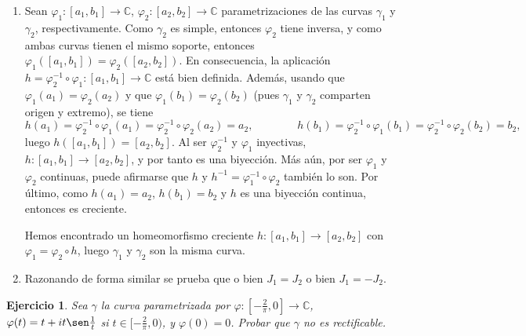 \documentclass[11pt]{report}
\makeatletter
\renewenvironment{proof}[1][\proofname]{\par
  \pushQED{\qed}%
  \normalfont \topsep\z@skip %
  \trivlist
  \item[\hskip\labelsep
        \itshape
    #1\@addpunct{.}]\ignorespaces
}{%
  \popQED\endtrivlist\@endpefalse
}
\newcommand{\C}{\mathbb C}
\newtheorem{exercise}{Ejercicio}
\makeatother
\begin{document}
\begin{proof}
\hfill
\begin{enumerate}
    \item Sean $\varphi_1 \colon [a_1,b_1] \to\C$, $\varphi_2 \colon [a_2,b_2] \to \C$ parametrizaciones de las curvas $\gamma_1$ y $\gamma_2$, respectivamente. Como $\gamma_2$ es simple, entonces $\varphi_2$ tiene inversa, y como ambas curvas tienen el mismo soporte, entonces $\varphi_1([a_1,b_1]) = \varphi_2([a_2,b_2])$. En consecuencia, la aplicación $h = \varphi_2^{-1} \circ \varphi_1 \colon [a_1,b_1] \to \C$ está bien definida. Además, usando que $\varphi_1(a_1)=\varphi_2(a_2)$ y que $\varphi_1(b_1) = \varphi_2(b_2)$ (pues $\gamma_1$ y $\gamma_2$ comparten origen y extremo), se tiene
    \[h(a_1) = \varphi_2^{-1} \circ \varphi_1(a_1) = \varphi_2^{-1} \circ \varphi_2(a_2) = a_2, \qquad \qquad h(b_1) = \varphi_2^{-1} \circ \varphi_1(b_1) = \varphi_2^{-1} \circ \varphi_2(b_2) = b_2,\]
    luego $h([a_1,b_1]) = [a_2,b_2]$. Al ser $\varphi_2^{-1}$ y $\varphi_1$ inyectivas, $h \colon [a_1,b_1] \to [a_2,b_2]$, y por tanto es una biyección. Más aún, por ser $\varphi_1$ y $\varphi_2$ continuas, puede afirmarse que $h$ y $h^{-1} = \varphi_1^{-1} \circ \varphi_2$ también lo son. Por último, como $h(a_1) = a_2$, $h(b_1) = b_2$ y $h$ es una biyección continua, entonces es creciente.

    Hemos encontrado un homeomorfismo creciente $h \colon [a_1,b_1] \to [a_2,b_2]$ con $\varphi_1 = \varphi_2 \circ h$, luego $\gamma_1$ y $\gamma_2$ son la misma curva.

    \item Razonando de forma similar se prueba que o bien $J_1 = J_2$ o bien $J_1 = -J_2$. \qedhere
\end{enumerate}
\end{proof}

\begin{exercise}
Sea $\gamma$ la curva parametrizada por $\varphi\colon[-\frac{2}{\pi},0] \to \C$, $\varphi(t) = t+it\sen\frac{1}{t}$ si $t \in [-\frac{2}{\pi},0)$, y $\varphi(0)=0$. Probar que $\gamma$ no es rectificable.
\end{exercise}
\end{document}
